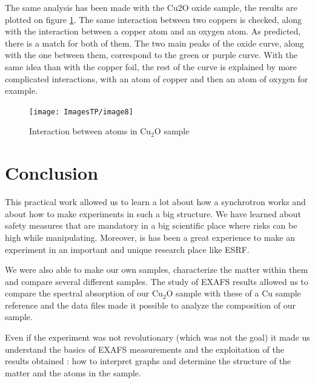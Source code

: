 \documentclass[11pt,a4paper,oneside]{report}
\begin{document}
The same analysis has been made with the Cu2O oxide sample, the results are plotted on figure \ref{graph5}. The same interaction between two coppers is checked, along with the interaction between a copper atom and an oxygen atom. As predicted, there is a match for both of them. The two main peaks of the oxide curve, along with the one between them, correspond to the green or purple curve. With the same idea than with the copper foil, the rest of the curve is explained by more complicated interactions, with an atom of copper and then an atom of oxygen for example.
\begin{figure}[H]
    \begin{center}
        \texttt{[image: ImagesTP/image8]}
        \caption{Interaction between atoms in Cu$_2$O sample}
        \label{graph5}
    \end{center}
\end{figure}

\clearpage
\newpage

\chapter*{Conclusion}

	This practical work allowed us to learn a lot about how a synchrotron works and about how to make experiments in such a big structure. We have learned about safety measures that are mandatory in a big scientific place where risks can be high while manipulating. Moreover, is has been a great experience to make an experiment in an important and unique research place like ESRF.
		
	We were also able to make our own samples, characterize the matter within them and compare several different samples. The study of EXAFS results allowed us to compare the spectral absorption of our Cu$_2$O sample with these of a Cu sample reference and the data files made it possible to analyze the composition of our sample. 
	
	Even if the experiment was not revolutionary (which was not the goal) it made us understand the basics of EXAFS measurements and the exploitation of the results obtained : how to interpret graphs and determine the structure of the matter and the atoms in the sample.

\nocite{*}


\end{document}
